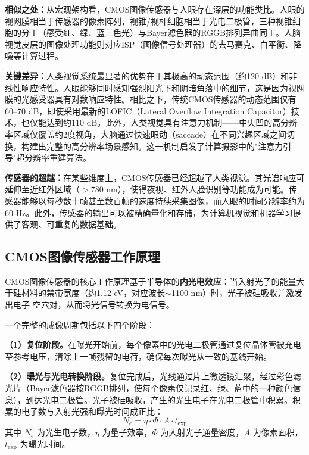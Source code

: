 \documentclass[12pt, a4paper]{ctexart}
\begin{document}
\textbf{相似之处：}从宏观架构看，CMOS图像传感器与人眼存在深层的功能类比。人眼的视网膜相当于传感器的像素阵列，视锥/视杆细胞相当于光电二极管，三种视锥细胞的分工（感受红、绿、蓝三色光）与Bayer滤色器的RGGB排列异曲同工。人脑视觉皮层的图像处理功能则对应ISP（图像信号处理器）的去马赛克、白平衡、降噪等计算过程。

\textbf{关键差异：}人类视觉系统最显著的优势在于其极高的动态范围（约120 dB）和非线性响应特性。人眼能够同时感知强烈阳光下和阴暗角落中的细节，这是因为视网膜的光感受器具有对数响应特性。相比之下，传统CMOS传感器的动态范围仅有60--70 dB，即使采用最新的LOFIC（Lateral Overflow Integration Capacitor）技术，也仅能达到约110 dB\cite{adhocnews2025}。此外，人类视觉具有注意力机制——中央凹的高分辨率区域仅覆盖约2度视角，大脑通过快速眼动（saccade）在不同兴趣区域之间切换，构建出完整的高分辨率场景感知。这一机制启发了计算摄影中的"注意力引导"超分辨率重建算法。

\textbf{传感器的超越：}在某些维度上，CMOS传感器已经超越了人类视觉。其光谱响应可延伸至近红外区域（$>$780 nm），使得夜视、红外人脸识别等功能成为可能。传感器能够以每秒数十帧甚至数百帧的速度持续采集图像，而人眼的时间分辨率约为60 Hz。此外，传感器的输出可以被精确量化和存储，为计算机视觉和机器学习提供了客观、可重复的数据基础。

\subsection{CMOS图像传感器工作原理}

CMOS图像传感器的核心工作原理基于半导体的\textbf{内光电效应}：当入射光子的能量大于硅材料的禁带宽度（约1.12 eV，对应波长$\sim$1100 nm）时，光子被硅吸收并激发出电子-空穴对，从而将光信号转换为电信号。

一个完整的成像周期包括以下四个阶段：

\textbf{（1）复位阶段。}在曝光开始前，每个像素中的光电二极管通过复位晶体管被充电至参考电压，清除上一帧残留的电荷，确保每次曝光从一致的基线开始。

\textbf{（2）曝光与光电转换阶段。}复位完成后，光线通过片上微透镜汇聚，经过彩色滤光片（Bayer滤色器按RGGB排列，使每个像素仅记录红、绿、蓝中的一种颜色信息），到达光电二极管。光子被硅吸收，产生的光生电子在光电二极管中积累。积累的电子数与入射光强和曝光时间成正比：
\begin{equation}
    N_e = \eta \cdot \Phi \cdot A \cdot t_{\text{exp}}
\end{equation}
其中 $N_e$ 为光生电子数，$\eta$ 为量子效率，$\Phi$ 为入射光子通量密度，$A$ 为像素面积，$t_{\text{exp}}$ 为曝光时间。
\end{document}
